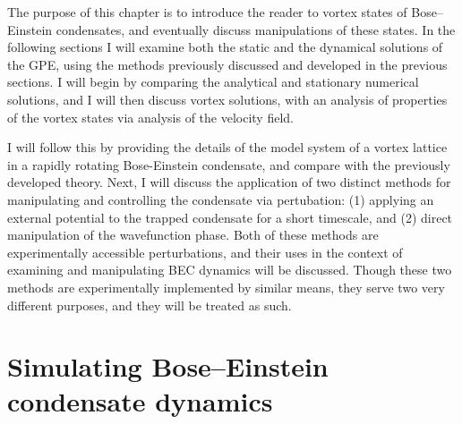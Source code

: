 The purpose of this chapter is to introduce the reader to vortex states of Bose--Einstein condensates, and eventually discuss manipulations of these states. In the following sections I will examine both the static and the dynamical solutions of the GPE, using the methods previously discussed and developed in the previous sections. I will begin by comparing the analytical and stationary numerical solutions, and I will then discuss vortex solutions, with an analysis of properties of the vortex states via analysis of the velocity field.

I will follow this by providing the details of the model system of a vortex lattice in a rapidly rotating Bose-Einstein condensate, and compare with the previously developed theory. Next, I will discuss the application of two distinct methods for manipulating and controlling the condensate via pertubation: (1) applying an external potential to the trapped condensate for a short timescale, and (2) direct manipulation of the wavefunction phase. Both of these methods are experimentally accessible perturbations, and their uses in the context of examining and manipulating BEC dynamics will be discussed. Though these two methods are experimentally implemented by similar means, they serve two very different purposes, and they will be treated as such.

\section{Simulating Bose--Einstein condensate dynamics}

